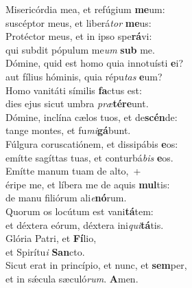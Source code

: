 \evenverse Misericórdia mea, et refúgium \textbf{me}um:~\*\\
\evenverse suscéptor meus, et liberá\textit{tor} \textbf{me}us:\\
\oddverse Protéctor meus, et in ipso spe\textbf{rá}vi:~\*\\
\oddverse qui subdit pópulum me\textit{um} \textbf{sub} me.\\
\evenverse Dómine, quid est homo quia innotuísti \textbf{e}i?~\*\\
\evenverse aut fílius hóminis, quia répu\textit{tas} \textbf{e}um?\\
\oddverse Homo vanitáti símilis \textbf{fa}ctus est:~\*\\
\oddverse dies ejus sicut umbra \textit{præ}\textbf{té}\textbf{re}unt.\\
\evenverse Dómine, inclína cælos tuos, et de\textbf{scén}de:~\*\\
\evenverse tange montes, et fu\textit{mi}\textbf{gá}bunt.\\
\oddverse Fúlgura coruscatiónem, et dissipábis \textbf{e}os:~\*\\
\oddverse emítte sagíttas tuas, et conturbá\textit{bis} \textbf{e}os.\\
\evenverse Emítte manum tuam de alto,~+\\
\evenverse  éripe me, et líbera me de aquis \textbf{mul}tis:~\*\\
\evenverse de manu filiórum ali\textit{e}\textbf{nó}rum.\\
\oddverse Quorum os locútum est vani\textbf{tá}tem:~\*\\
\oddverse et déxtera eórum, déxtera ini\textit{qui}\textbf{tá}tis.\\
\evenverse Glória Patri, et \textbf{Fí}lio,~\*\\
\evenverse et Spirítu\textit{i} \textbf{San}cto.\\
\oddverse Sicut erat in princípio, et nunc, et \textbf{sem}per,~\*\\
\oddverse et in sǽcula sæculó\textit{rum}. \textbf{A}men.\\
